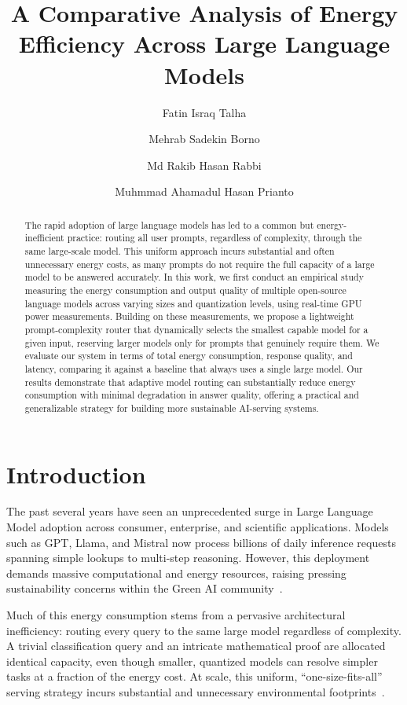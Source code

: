 \documentclass[runningheads]{llncs}
\title{A Comparative Analysis of Energy Efficiency Across Large Language Models}
\author{Fatin Israq Talha \and
Mehrab Sadekin Borno \and
Md Rakib Hasan Rabbi \and
Muhmmad Ahamadul Hasan Prianto}
\institute{Department of Computer Science and Engineering,\\
United International University, Dhaka, Bangladesh}
\begin{document}
\maketitle

\begin{abstract}
The rapid adoption of large language models has led to a common but energy-inefficient practice: routing all user prompts, regardless of complexity, through the same large-scale model. This uniform approach incurs substantial and often unnecessary energy costs, as many prompts do not require the full capacity of a large model to be answered accurately. In this work, we first conduct an empirical study measuring the energy consumption and output quality of multiple open-source language models across varying sizes and quantization levels, using real-time GPU power measurements. Building on these measurements, we propose a lightweight prompt-complexity router that dynamically selects the smallest capable model for a given input, reserving larger models only for prompts that genuinely require them. We evaluate our system in terms of total energy consumption, response quality, and latency, comparing it against a baseline that always uses a single large model. Our results demonstrate that adaptive model routing can substantially reduce energy consumption with minimal degradation in answer quality, offering a practical and generalizable strategy for building more sustainable AI-serving systems.

\end{abstract}

\section{Introduction}
\label{sec:introduction}
 
The past several years have seen an unprecedented surge in Large Language Model adoption across consumer, enterprise, and scientific applications. Models such as GPT, Llama, and Mistral now process billions of daily inference requests spanning simple lookups to multi-step reasoning. However, this deployment demands massive computational and energy resources, raising pressing sustainability concerns within the Green AI community~\cite{strubell2019energy, schwartz2020greenai}.
 
Much of this energy consumption stems from a pervasive architectural inefficiency: routing every query to the same large model regardless of complexity. A trivial classification query and an intricate mathematical proof are allocated identical capacity, even though smaller, quantized models can resolve simpler tasks at a fraction of the energy cost. At scale, this uniform, ``one-size-fits-all'' serving strategy incurs substantial and unnecessary environmental footprints~\cite{strubell2019energy}.
\end{document}
